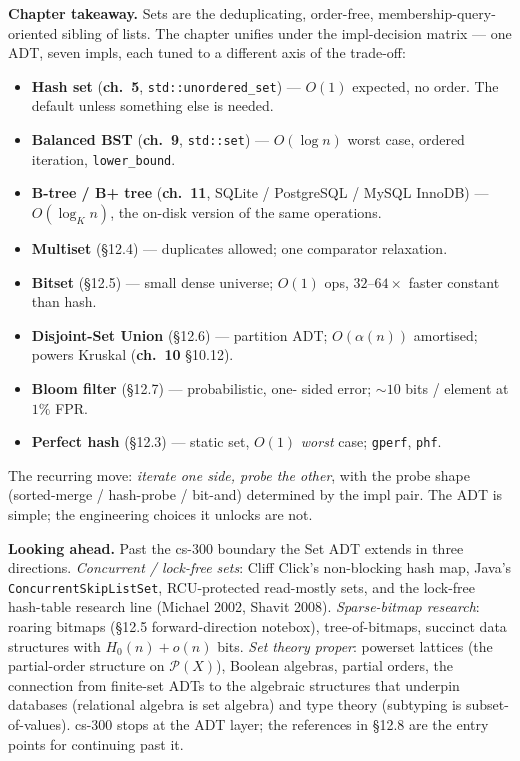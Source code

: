 \documentclass[11pt]{article}
\begin{document}
\begin{ideabox}
\textbf{Chapter takeaway.} Sets are the deduplicating, order-free,
membership-query-oriented sibling of lists. The chapter unifies
under the impl-decision matrix --- one ADT, seven impls, each tuned
to a different axis of the trade-off:
\begin{itemize}[leftmargin=*]
    \item \textbf{Hash set} (\textbf{ch.~5}, \texttt{std::unordered\_set}) --- $O(1)$ expected, no order.
          The default unless something else is needed.
    \item \textbf{Balanced BST} (\textbf{ch.~9},
          \texttt{std::set}) --- $O(\log n)$ worst case, ordered
          iteration, \texttt{lower\_bound}.
    \item \textbf{B-tree / B+ tree} (\textbf{ch.~11}, SQLite /
          PostgreSQL / MySQL InnoDB) --- $O(\log_K n)$, the
          on-disk version of the same operations.
    \item \textbf{Multiset} (\S12.4) --- duplicates allowed; one
          comparator relaxation.
    \item \textbf{Bitset} (\S12.5) --- small dense universe;
          $O(1)$ ops, $32$--$64\times$ faster constant than hash.
    \item \textbf{Disjoint-Set Union} (\S12.6) --- partition ADT;
          $O(\alpha(n))$ amortised; powers Kruskal (\textbf{ch.~10}
          \S10.12).
    \item \textbf{Bloom filter} (\S12.7) --- probabilistic, one-
          sided error; $\sim 10$ bits / element at $1\%$ FPR.
    \item \textbf{Perfect hash} (\S12.3) --- static set, $O(1)$
          \emph{worst} case; \texttt{gperf}, \texttt{phf}.
\end{itemize}
The recurring move: \emph{iterate one side, probe the other}, with
the probe shape (sorted-merge / hash-probe / bit-and) determined
by the impl pair. The ADT is simple; the engineering choices it
unlocks are not.

\textbf{Looking ahead.} Past the cs-300 boundary the Set ADT
extends in three directions. \emph{Concurrent / lock-free sets}:
Cliff Click's non-blocking hash map, Java's
\texttt{ConcurrentSkipListSet}, RCU-protected read-mostly sets,
and the lock-free hash-table research line (Michael 2002,
Shavit 2008). \emph{Sparse-bitmap research}: roaring bitmaps
(\S12.5 forward-direction notebox), tree-of-bitmaps, succinct
data structures with $H_0(n) + o(n)$ bits.
\emph{Set theory proper}: powerset lattices (the partial-order
structure on $\mathcal{P}(X)$), Boolean algebras, partial orders,
the connection from finite-set ADTs to the algebraic structures
that underpin databases (relational algebra is set algebra) and
type theory (subtyping is subset-of-values). cs-300 stops at the
ADT layer; the references in \S12.8 are the entry points for
continuing past it.
\end{ideabox}
\end{document}
